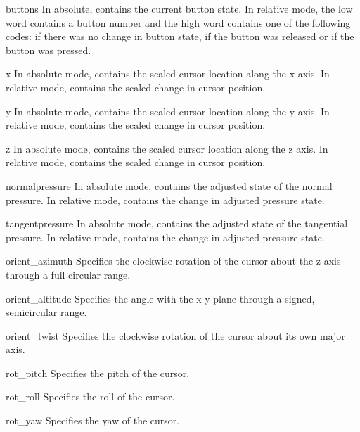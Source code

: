 \begin{memberdesc}{buttons}
In absolute, contains the current button state. In relative mode, the low
word contains a button number and the high word contains one of the following
codes:  if there was no change in button state, 
if the button was released or  if the button was pressed.
\end{memberdesc}

\begin{memberdesc}{x}
In absolute mode, contains the scaled cursor location along the x axis.
In relative mode, contains the scaled change in cursor position.
\end{memberdesc}

\begin{memberdesc}{y}
In absolute mode, contains the scaled cursor location along the y axis.
In relative mode, contains the scaled change in cursor position.
\end{memberdesc}

\begin{memberdesc}{z}
In absolute mode, contains the scaled cursor location along the z axis.
In relative mode, contains the scaled change in cursor position.
\end{memberdesc}

\begin{memberdesc}{normalpressure}
In absolute mode, contains the adjusted state of the normal pressure.
In relative mode, contains the change in adjusted pressure state.
\end{memberdesc}

\begin{memberdesc}{tangentpressure}
In absolute mode, contains the adjusted state of the tangential pressure.
In relative mode, contains the change in adjusted pressure state.
\end{memberdesc}

\begin{memberdesc}{orient_azimuth}
Specifies the clockwise rotation of the cursor about the z axis through
a full circular range.
\end{memberdesc}

\begin{memberdesc}{orient_altitude}
Specifies the angle with the x-y plane through a signed, semicircular range.
\end{memberdesc}

\begin{memberdesc}{orient_twist}
Specifies the clockwise rotation of the cursor about its own major axis.
\end{memberdesc}

\begin{memberdesc}{rot_pitch}
Specifies the pitch of the cursor.
\end{memberdesc}

\begin{memberdesc}{rot_roll}
Specifies the roll of the cursor.
\end{memberdesc}

\begin{memberdesc}{rot_yaw}
Specifies the yaw of the cursor.
\end{memberdesc}


